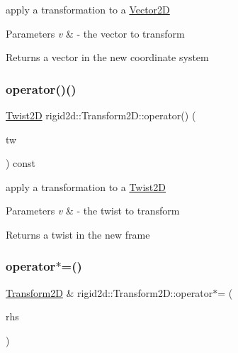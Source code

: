 apply a transformation to a \hyperlink{structrigid2d_1_1Vector2D}{Vector2D} 


\begin{DoxyParams}{Parameters}
{\em v} & -\/ the vector to transform \\
\hline
\end{DoxyParams}
\begin{DoxyReturn}{Returns}
a vector in the new coordinate system 
\end{DoxyReturn}
\mbox{\label{classrigid2d_1_1Transform2D_ad31ac545a107b5aea5a9a2c69b77ab6c}} 
\subsubsection{\texorpdfstring{operator()()}{operator()()}\hspace{0.1cm}{\footnotesize\ttfamily [2/2]}}
{\footnotesize\ttfamily \hyperlink{structrigid2d_1_1Twist2D}{Twist2D} rigid2d\+::\+Transform2\+D\+::operator() (\begin{DoxyParamCaption}\item[{\hyperlink{structrigid2d_1_1Twist2D}{Twist2D}}]{tw }\end{DoxyParamCaption}) const}



apply a transformation to a \hyperlink{structrigid2d_1_1Twist2D}{Twist2D} 


\begin{DoxyParams}{Parameters}
{\em v} & -\/ the twist to transform \\
\hline
\end{DoxyParams}
\begin{DoxyReturn}{Returns}
a twist in the new frame 
\end{DoxyReturn}
\mbox{\label{classrigid2d_1_1Transform2D_ab8ae83c47e43afdcc0b2bcca0ae34fb7}} 
\subsubsection{\texorpdfstring{operator$\ast$=()}{operator*=()}}
{\footnotesize\ttfamily \hyperlink{classrigid2d_1_1Transform2D}{Transform2D} \& rigid2d\+::\+Transform2\+D\+::operator$\ast$= (\begin{DoxyParamCaption}\item[{const \hyperlink{classrigid2d_1_1Transform2D}{Transform2D} \&}]{rhs }\end{DoxyParamCaption})}



